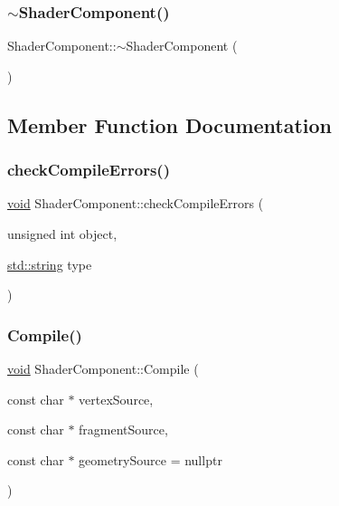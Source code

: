 \mbox{\label{classShaderComponent_a8bb8e340123f28784cddaa2bf627c040}} 
\subsubsection{\texorpdfstring{$\sim$\+Shader\+Component()}{~ShaderComponent()}}
{\footnotesize\ttfamily Shader\+Component\+::$\sim$\+Shader\+Component (\begin{DoxyParamCaption}{ }\end{DoxyParamCaption})}



\subsection{Member Function Documentation}
\mbox{\label{classShaderComponent_a92f704bba9b4bb0cc0375126345c8295}} 
\subsubsection{\texorpdfstring{check\+Compile\+Errors()}{checkCompileErrors()}}
{\footnotesize\ttfamily \hyperlink{imgui__impl__opengl3__loader_8h_ac668e7cffd9e2e9cfee428b9b2f34fa7}{void} Shader\+Component\+::check\+Compile\+Errors (\begin{DoxyParamCaption}\item[{unsigned int}]{object,  }\item[{\hyperlink{imgui__impl__opengl3__loader_8h_ac83513893df92266f79a515488701770}{std\+::string}}]{type }\end{DoxyParamCaption})\hspace{0.3cm}{\ttfamily [private]}}

\mbox{\label{classShaderComponent_a157e28adca7dc3a8bd978162d45746ba}} 
\subsubsection{\texorpdfstring{Compile()}{Compile()}}
{\footnotesize\ttfamily \hyperlink{imgui__impl__opengl3__loader_8h_ac668e7cffd9e2e9cfee428b9b2f34fa7}{void} Shader\+Component\+::\+Compile (\begin{DoxyParamCaption}\item[{const char $\ast$}]{vertex\+Source,  }\item[{const char $\ast$}]{fragment\+Source,  }\item[{const char $\ast$}]{geometry\+Source = {\ttfamily nullptr} }\end{DoxyParamCaption})\hspace{0.3cm}{\ttfamily [private]}}

